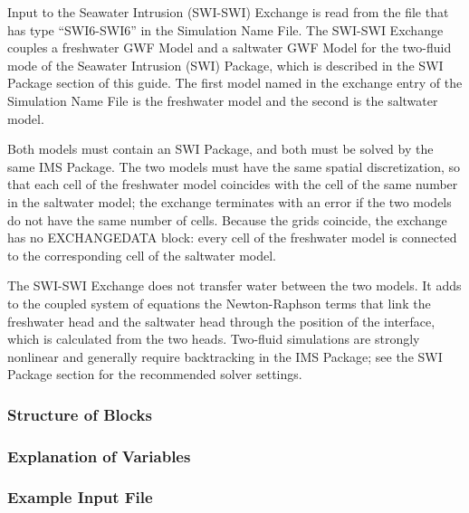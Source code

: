 Input to the Seawater Intrusion (SWI-SWI) Exchange is read from the file that has type ``SWI6-SWI6'' in the Simulation Name File.  The SWI-SWI Exchange couples a freshwater GWF Model and a saltwater GWF Model for the two-fluid mode of the Seawater Intrusion (SWI) Package, which is described in the SWI Package section of this guide.  The first model named in the exchange entry of the Simulation Name File is the freshwater model and the second is the saltwater model.

Both models must contain an SWI Package, and both must be solved by the same IMS Package.  The two models must have the same spatial discretization, so that each cell of the freshwater model coincides with the cell of the same number in the saltwater model; the exchange terminates with an error if the two models do not have the same number of cells.  Because the grids coincide, the exchange has no EXCHANGEDATA block: every cell of the freshwater model is connected to the corresponding cell of the saltwater model.

The SWI-SWI Exchange does not transfer water between the two models.  It adds to the coupled system of equations the Newton-Raphson terms that link the freshwater head and the saltwater head through the position of the interface, which is calculated from the two heads.  Two-fluid simulations are strongly nonlinear and generally require backtracking in the IMS Package; see the SWI Package section for the recommended solver settings.

\vspace{5mm}
\subsubsection{Structure of Blocks}


\vspace{5mm}
\subsubsection{Explanation of Variables}
\begin{description}

\end{description}

\vspace{5mm}
\subsubsection{Example Input File}

